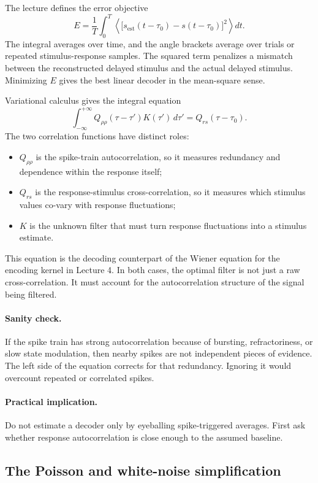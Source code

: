 The lecture defines the error objective
\[
    E
    =
    \frac{1}{T}\int_0^T
    \left\langle
    \bigl[
      s_{\mathrm{est}}(t-\tau_0)-s(t-\tau_0)
    \bigr]^2
    \right\rangle
    d t .
\]
The integral averages over time, and the angle brackets average over trials or repeated stimulus-response samples. The squared term penalizes a mismatch between the reconstructed delayed stimulus and the actual delayed stimulus. Minimizing $E$ gives the best linear decoder in the mean-square sense.

Variational calculus gives the integral equation
\[
    \int_{-\infty}^{+\infty}
    Q_{\rho\rho}(\tau-\tau')K(\tau')\,d\tau'
    =
    Q_{rs}(\tau-\tau_0).
\]
The two correlation functions have distinct roles:
\begin{itemize}
    \item $Q_{\rho\rho}$ is the spike-train autocorrelation, so it measures redundancy and dependence within the response itself;
    \item $Q_{rs}$ is the response-stimulus cross-correlation, so it measures which stimulus values co-vary with response fluctuations;
    \item $K$ is the unknown filter that must turn response fluctuations into a stimulus estimate.
\end{itemize}

This equation is the decoding counterpart of the Wiener equation for the encoding kernel in Lecture 4. In both cases, the optimal filter is not just a raw cross-correlation. It must account for the autocorrelation structure of the signal being filtered.

\paragraph{Sanity check.}
If the spike train has strong autocorrelation because of bursting, refractoriness, or slow state modulation, then nearby spikes are not independent pieces of evidence. The left side of the equation corrects for that redundancy. Ignoring it would overcount repeated or correlated spikes.

\paragraph{Practical implication.}
Do not estimate a decoder only by eyeballing spike-triggered averages. First ask whether response autocorrelation is close enough to the assumed baseline.

\subsection{The Poisson and white-noise simplification}

